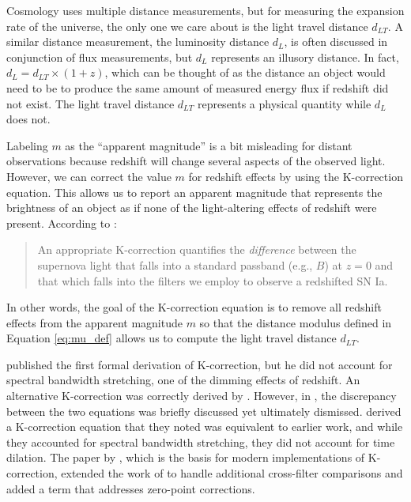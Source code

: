 Cosmology uses multiple distance measurements, but for measuring the expansion
rate of the universe, the only one we care about is the light travel distance
$d_{LT}$. A similar distance measurement, the luminosity distance $d_L$, is
often discussed in conjunction of flux measurements, but $d_L$ represents an
illusory distance. In fact, ${d_{L} = d_{LT} \times (1 + z)}$, which can be
thought of as the distance an object would need to be to produce the same
amount of measured energy flux if redshift did not exist. The light travel
distance $d_{LT}$ represents a physical quantity while $d_{L}$ does not.

Labeling $m$ as the ``apparent magnitude'' is a bit misleading for distant
observations because redshift will change several aspects of the observed
light. However, we can correct the value $m$ for redshift effects by using the
K-correction equation. This allows us to report an apparent magnitude that
represents the brightness of an object as if none of the light-altering effects
of redshift were present. According to \citet{riess1998}:

\begin{quote}
  An appropriate K-correction quantifies the \emph{difference} between the supernova
  light that falls into a standard passband (e.g., $B$) at ${z = 0}$ and that
  which falls into the filters we employ to observe a redshifted SN Ia.
\end{quote}

\noindent In other words, the goal of the K-correction equation is to remove
all redshift effects from the apparent magnitude $m$ so that the distance
modulus defined in Equation \ref{eq:mu_def} allows us to compute the light
travel distance $d_{LT}$.

\citet{tolman1930} published the first formal derivation of K-correction, but
he did not account for spectral bandwidth stretching, one of the dimming
effects of redshift. An alternative K-correction was correctly derived by
\citet{desitter1934}. However, in \citet{hubble1935}, the discrepancy between
the two equations was briefly discussed yet ultimately dismissed.
\citet{oke1968} derived a K-correction equation that they noted was equivalent
to earlier work, and while they accounted for spectral bandwidth stretching,
they did not account for time dilation. The paper by \citet{kim1996}, which is
the basis for modern implementations of K-correction, extended the work of
\citet{oke1968} to handle additional cross-filter comparisons and added a term
that addresses zero-point corrections.

